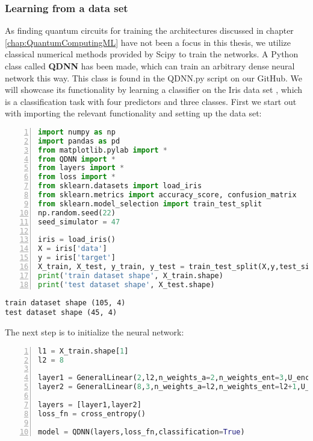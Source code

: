 \subsubsection{Learning from a data set}
As finding quantum circuits for training the architectures discussed in chapter \ref{chap:QuantumComputingML} have not been a focus in this thesis, we utilize classical numerical methods provided by Scipy \cite{ScipyOptimizeMinimize} to train the networks. A Python class called \textbf{QDNN} has been made, which can train an arbitrary dense neural network this way. This class is found in the QDNN.py script on our GitHub. We will showcase its functionality by learning a classifier on the Iris data set \cite{IrisData}, which is a classification task with four predictors and three classes. First we start out with importing the relevant functionality and setting up the data set:
\begin{lstlisting}[language=Python,numbers=left]
import numpy as np 
import pandas as pd 
from matplotlib.pylab import *
from QDNN import *
from layers import *
from loss import *
from sklearn.datasets import load_iris
from sklearn.metrics import accuracy_score, confusion_matrix
from sklearn.model_selection import train_test_split
np.random.seed(22)
seed_simulator = 47

iris = load_iris()
X = iris['data']
y = iris['target']
X_train, X_test, y_train, y_test = train_test_split(X,y,test_size=0.3)
print('train dataset shape', X_train.shape)
print('test dataset shape', X_test.shape)
\end{lstlisting}
\begin{verbatim}
train dataset shape (105, 4)
test dataset shape (45, 4)
\end{verbatim}
The next step is to initialize the neural network:
\begin{lstlisting}[language=Python,numbers=left]
l1 = X_train.shape[1]
l2 = 8

layer1 = GeneralLinear(2,l2,n_weights_a=2,n_weights_ent=3,U_enc=AmplitudeEncoder(),U_a = YRotationAnsatz(linear_entangler),U_ent=YRotation(bias=True),seed_simulator=seed_simulator,n_parallel=l2)
layer2 = GeneralLinear(8,3,n_weights_a=l2,n_weights_ent=l2+1,U_enc=YRotationAnsatz(linear_entangler),U_a=YRotationAnsatz(linear_entangler),U_ent=YRotation(bias=True),seed_simulator=42)

layers = [layer1,layer2]
loss_fn = cross_entropy()

model = QDNN(layers,loss_fn,classification=True)
\end{lstlisting}
